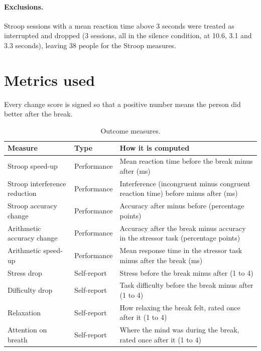 \documentclass[11pt,a4paper]{article}
\begin{document}
\paragraph{Exclusions.} Stroop sessions with a mean reaction time above 3 seconds were treated as interrupted and dropped (3 sessions, all in the silence condition, at 10.6, 3.1 and 3.3 seconds), leaving 38 people for the Stroop measures.

\section{Metrics used}

Every change score is signed so that a positive number means the person did better after the break.

\begin{table}[!htbp]
\centering\small
\caption{Outcome measures.}
\label{tab:metrics}
\begin{tabularx}{\textwidth}{>{\raggedright\arraybackslash}p{4.2cm}>{\raggedright\arraybackslash}p{2.3cm}L}
\toprule
\textbf{Measure} & \textbf{Type} & \textbf{How it is computed}\\
\midrule
Stroop speed-up & Performance & Mean reaction time before the break minus after (ms)\\
Stroop interference reduction & Performance & Interference (incongruent minus congruent reaction time) before minus after (ms)\\
Stroop accuracy change & Performance & Accuracy after minus before (percentage points)\\
Arithmetic accuracy change & Performance & Accuracy after the break minus accuracy in the stressor task (percentage points)\\
Arithmetic speed-up & Performance & Mean response time in the stressor task minus after the break (ms)\\
Stress drop & Self-report & Stress before the break minus after (1 to 4)\\
Difficulty drop & Self-report & Task difficulty before the break minus after (1 to 4)\\
Relaxation & Self-report & How relaxing the break felt, rated once after it (1 to 4)\\
Attention on breath & Self-report & Where the mind was during the break, rated once after it (1 to 4)\\
\bottomrule
\end{tabularx}
\end{table}
\end{document}
